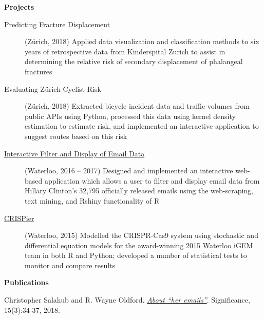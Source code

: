 \documentclass[letterpaper,11pt]{article}
\makeatletter
\newcommand{\resheading}[1]{\colorbox{resBlue}{\begin{minipage}{\textwidth}
			\textbf{#1}
\end{minipage}} \vspace{-14pt}}
\newcommand{\resitem}[4]{\begin{tabular*}{17.5cm}{l@{\extracolsep{\fill}}r} \textbf{#1} & #2 \\ \textit{#3} & \textit{#4} \\ \end{tabular*} \vspace{-6pt}}
\makeatother
\begin{document}
\begin{itemize}
\begin{comment}
			\end{description}}
\item
	\resitem{\href{https://www.calgarystampede.com/}{The Calgary Stampede}}{Calgary, AB}{Parking Attendant}{July 2011, July 2012}
		{\footnotesize \begin{description}
				\item[Teamwork] Managed parking at a surface lot with a team during the annual Calgary Exhibition and Stampede
				\item[Customer Service] Engaged positively with customers and other employees, garnering the Golden Pylon Award for excellence in customer service both years employed
			\end{description}}
\end{comment}
\end{itemize}

\resheading{Projects}
\begin{description}\item[Predicting Fracture Displacement] (Z\"urich, 2018) {\footnotesize Applied data visualization and classification methods to six years of retrospective data from Kinderspital Zurich to assist in determining the relative risk of secondary displacement of phalangeal fractures}
\item[Evaluating Z\"urich Cyclist Risk] (Z\"urich, 2018) {\footnotesize Extracted bicycle incident data and traffic volumes from public APIs using Python, processed this data using kernel density estimation to estimate risk, and implemented an interactive application to suggest routes based on this risk}
\item[\href{https://shiny.math.uwaterloo.ca/sas/clinton/}{Interactive Filter and Display of Email Data}] (Waterloo, 2016 -- 2017) {\footnotesize Designed and implemented an interactive web-based application which allows a user to filter and display email data from Hillary Clinton's 32,795 officially released emails using the web-scraping, text mining, and Rshiny functionality of R}
\item[\href{http://2015.igem.org/Team:Waterloo}{CRISPier}] (Waterloo, 2015) {\footnotesize Modelled the CRISPR-Cas9 system using stochastic and differential equation models for the award-winning 2015 Waterloo iGEM team in both R and Python; developed a number of statistical tests to monitor and compare results}
\end{description}

\resheading{Publications}
\begin{description}
	\item
	Christopher Salahub and R. Wayne Oldford. \href{https://rss.onlinelibrary.wiley.com/doi/full/10.1111/j.1740-9713.2018.01148.x}{\textit{About ``her emails''}}. Significance, 15(3):34-37, 2018. 
\end{description}
\end{document}
